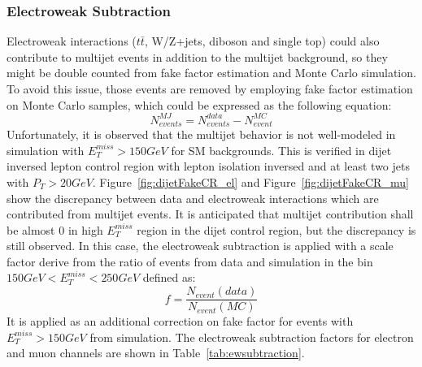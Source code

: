 \subsubsection*{Electroweak Subtraction}

Electroweak interactions ($t\bar{t}$, W/Z+jets, diboson and single top) could also contribute to multijet events in addition to the multijet background, so they might be double counted from fake factor estimation and Monte Carlo simulation. To avoid this issue, those events are removed by employing fake factor estimation on Monte Carlo samples, which could be expressed as the following equation:
\begin{equation}
 N^{MJ}_{events} = N^{data}_{events}-N^{MC}_{event}
\end{equation}
Unfortunately, it is observed that the multijet behavior is not well-modeled in simulation with $E_{T}^{miss}>150 GeV$ for SM backgrounds. This is verified in dijet inversed lepton control region with lepton isolation inversed and at least two jets with $P_{T}>20GeV$. Figure~\ref{fig:dijetFakeCR_el} and Figure~\ref{fig:dijetFakeCR_mu} show the discrepancy between data and electroweak interactions which are contributed from multijet events. It is anticipated that multijet contribution shall be almost 0 in high $E^{miss}_{T}$ region in the dijet control region, but the discrepancy is still observed. In this case, the electroweak subtraction is applied with a scale factor derive from the ratio of events from data and simulation in the bin $150 GeV<E^{miss}_{T}<250GeV$ defined as: 
\begin{equation}
f = \frac{N_{event}(data)}{N_{event}(MC)}
\end{equation}
It is applied as an additional correction on fake factor for events with $E_{T}^{miss}>150 GeV$ from simulation. The electroweak subtraction factors for electron and muon channels are shown in Table~\ref{tab:ewsubtraction}.

